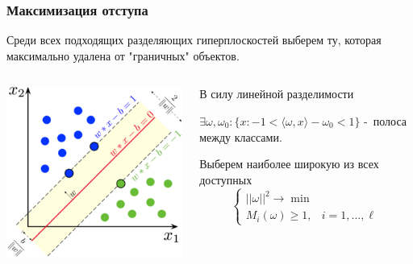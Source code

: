\documentclass{beamer}
\begin{document}
	\begin{frame}
		\frametitle{Максимизация отступа}
		Среди всех подходящих разделяющих гиперплоскостей выберем ту, которая максимально удалена от "граничных" объектов.
		
		\vspace{5pt}
		
		\begin{columns}
			\begin{column}{0.4\textwidth}
				\centering
				\includegraphics[width=\textwidth]{img/svm.png}		
			\end{column}
			\begin{column}{0.6\textwidth}
				В силу линейной разделимости
				
				$\exists \omega, \omega_0 : \{x: -1 < \langle \omega, x \rangle - \omega_0 < 1\}$
				-~полоса между классами.
				
				\vspace{5pt}
				
				Выберем наиболее широкую из всех доступных
				\[
				\begin{cases}
					||\omega||^2 \rightarrow \min \\
					M_i(\omega) \ge 1, &  i=1, ..., \ell
				\end{cases}
				\]
			\end{column}
		\end{columns}
	\end{frame}
	
\end{document}
